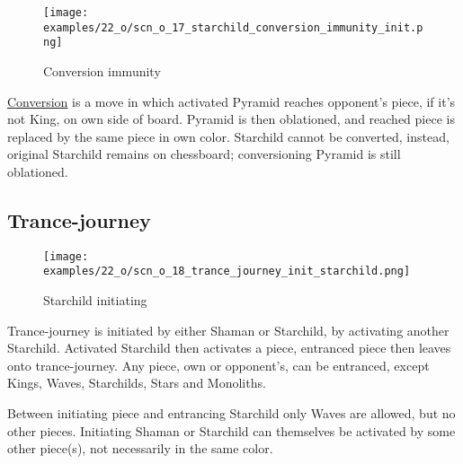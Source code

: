 \vspace*{-0.9\baselineskip}
\noindent
\begin{figure}[!h]
\texttt{[image: examples/22\_o/scn\_o\_17\_starchild\_conversion\_immunity\_init.png]}
\caption{Conversion immunity}
\label{fig:scn_o_17_starchild_conversion_immunity_init}
\end{figure}

\hyperref[sec:Mayan Ascendancy/Pyramid/Conversion]{Conversion} is a move in which activated
Pyramid reaches opponent's piece, if it's not King, on own side of board. Pyramid is then
oblationed, and reached piece is replaced by the same piece in own color.
Starchild cannot be converted, instead, original Starchild remains on chessboard;
conversioning Pyramid is still oblationed.

\clearpage %

\subsection*{Trance-journey}

\vspace*{-1.1\baselineskip}
\noindent
\begin{wrapfigure}[11]{l}{0.4\textwidth}
\centering
\texttt{[image: examples/22\_o/scn\_o\_18\_trance\_journey\_init\_starchild.png]}
\caption{Starchild initiating}
\label{fig:scn_o_18_trance_journey_init_starchild}
\end{wrapfigure}
Trance-journey is initiated by either Shaman or Starchild, by activating another Starchild.
Activated Starchild then activates a piece, entranced piece then leaves onto trance-journey.
Any piece, own or opponent's, can be entranced, except Kings, Waves, Starchilds, Stars and
Monoliths.

Between initiating piece and entrancing Starchild only Waves are allowed, but no other pieces.
Initiating Shaman or Starchild can themselves be activated by some other piece(s), not necessarily
in the same color.

